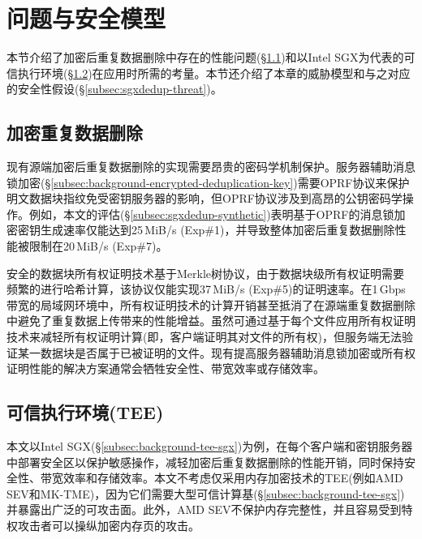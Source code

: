 \section{问题与安全模型}
\label{sec:sgxdedup-background}

本节介绍了加密后重复数据删除中存在的性能问题(\S\ref{subsec:sgxdedup-problem})和以Intel SGX为代表的可信执行环境(\S\ref{subsec:sgxdedup-sgx})在应用时所需的考量。本节还介绍了本章的威胁模型和与之对应的安全性假设(\S\ref{subsec:sgxdedup-threat})。

\subsection{加密重复数据删除}
\label{subsec:sgxdedup-problem}

现有源端加密后重复数据删除的实现需要昂贵的密码学机制保护。服务器辅助消息锁加密(\S\ref{subsec:background-encrypted-deduplication-key})需要OPRF协议\cite{naor2004Number}来保护明文数据块指纹免受密钥服务器的影响，但OPRF协议涉及到高昂的公钥密码学操作。例如，本文的评估(\S\ref{subsec:sgxdedup-synthetic})表明基于OPRF的消息锁加密密钥生成速率仅能达到25\,MiB/s (Exp\#1)，并导致整体加密后重复数据删除性能被限制在20\,MiB/s (Exp\#7)。

安全的数据块所有权证明技术基于Merkle树协议，由于数据块级所有权证明需要频繁的进行哈希计算，该协议仅能实现37\,MiB/s (Exp\#5)的证明速率。在1\,Gbps带宽的局域网环境中，所有权证明技术的计算开销甚至抵消了在源端重复数据删除中避免了重复数据上传带来的性能增益。虽然可通过基于每个文件应用所有权证明技术来减轻所有权证明计算(即，客户端证明其对文件的所有权)，但服务端无法验证某一数据块是否属于已被证明的文件。现有提高服务器辅助消息锁加密或所有权证明性能的解决方案通常会牺牲安全性\cite{li2020TED,xu2013weak,pietro12}、带宽效率\cite{harnik2010side,li15}或存储效率\cite{zhou2015secdep,qin17,li2020TED}。


\subsection{可信执行环境(TEE)}
\label{subsec:sgxdedup-sgx}

本文以Intel SGX\cite{sgx}(\S\ref{subsec:background-tee-sgx})为例，在每个客户端和密钥服务器中部署安全区以保护敏感操作，减轻加密后重复数据删除的性能开销，同时保持安全性、带宽效率和存储效率。本文不考虑仅采用内存加密技术的TEE(例如AMD SEV\cite{AMDSEV}和MK-TME\cite{MK-TME})，因为它们需要大型可信计算基(\S\ref{subsec:background-tee-sgx})并暴露出广泛的可攻击面\cite{mofrad18}。此外，AMD SEV\cite{AMDSEV}不保护内存完整性，并且容易受到特权攻击者可以操纵加密内存页\cite{mofrad18}的攻击。


